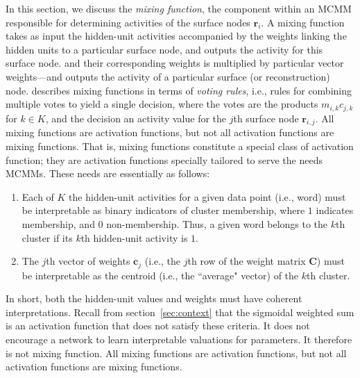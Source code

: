 In this section, we discuss the \emph{mixing function}, 
the component within an MCMM responsible for determining activities of the surface nodes $\textbf{r}_i$.
A mixing function takes as input the hidden-unit activities accompanied by the weights 
linking the hidden units to a particular surface node, and outputs the activity 
for this surface node. and their corresponding weights is  multiplied by 
particular vector weights---and outputs the activity of a particular surface 
(or reconstruction) node.  \citet{saund:94} describes mixing functions in terms of 
\emph{voting rules}, i.e., rules for combining multiple votes to yield a single decision, 
where the votes are the products $m_{i,k}c_{j,k}$ for $k \in K$, and the decision an 
activity value for the $j$th surface node $\textbf{r}_{i,j}$. All mixing functions
are activation functions, but not all activation functions are mixing functions.
That is, mixing functions constitute a special class of activation function; they are 
activation functions
specially tailored to serve the needs MCMMs. These needs are essentially as follows:
\begin{enumerate}
\item Each of $K$ the hidden-unit activities for a given data point (i.e., word) 
must be interpretable as binary indicators of cluster membership, where $1$ 
indicates membership, and $0$ non-membership. Thus, a given word belongs to the 
$k$th cluster if its $k$th hidden-unit activity is $1$.
\item The $j$th vector of weights $\textbf{c}_j$ (i.e., the $j$th row 
of the weight matrix $\textbf{C}$) must be interpretable as the centroid 
(i.e., the ``average" vector) of the $k$th cluster. 
\end{enumerate}
In short, both the hidden-unit values and weights must have coherent interpretations. 
Recall from section~\ref{sec:context} that the sigmoidal weighted sum is 
an activation function that does not satisfy these criteria. It does not encourage 
a network to learn interpretable valuations for parameters. It therefore is 
not mixing function. All mixing functions
are activation functions, but not all activation functions are mixing functions.


